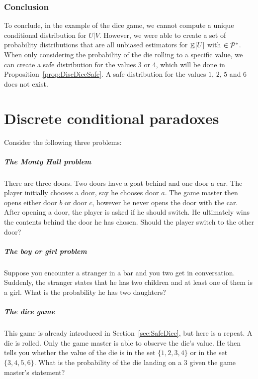 \documentclass[a4paper]{report}
\theoremstyle{plain}
\theoremstyle{definition}
\theoremstyle{remark}
\numberwithin{equation}{chapter}
\let\P\relax
\DeclareMathOperator{\P}{\mathbb{P}}
\DeclareMathOperator{\E}{\mathbb{E}}
\DeclareMathOperator{\1}{\mathbbm{1}}
\newcommand{\Pmod}{\mathcal{P}^*}
\begin{document}
\subsection{Conclusion}
To conclude, in the example of the dice game, we cannot compute a unique conditional distribution for $U|V$. However, we were able to create a set of probability distributions that are all unbiased estimators for $\E_{\P}[U]$ with $\P\in\Pmod$. When only considering the probability of the die rolling to a specific value, we can create a safe distribution for the values 3 or 4, which will be done in Proposition~\ref{prop:DiscDiceSafe}. A safe distribution for the values $1$, $2$, $5$ and $6$ does not exist.

\chapter{Discrete conditional paradoxes}\label{chap:DiscPara}
Consider the following three problems:

\paragraph{The Monty Hall problem}
There are three doors. Two doors have a goat behind and one door a car. The player initially chooses a door, say he chooses door $a$. The game master then opens either door $b$ or door $c$, however he never opens the door with the car. After opening a door, the player is asked if he should switch. He ultimately wins the contents behind the door he has chosen. Should the player switch to the other door?


\paragraph{The boy or girl problem}
Suppose you encounter a stranger in a bar and you two get in conversation. Suddenly, the stranger states that he has two children and at least one of them is a girl. What is the probability he has two daughters?

\paragraph{The dice game}
This game is already introduced in Section~\ref{sec:SafeDice}, but here is a repeat. A die is rolled. Only the game master is able to observe the die's value. He then tells you whether the value of the die is in the set $\{1,2,3,4\}$ or in the set $\{3,4,5,6\}$. What is the probability of the die landing on a $3$ given the game master's statement?
\end{document}
